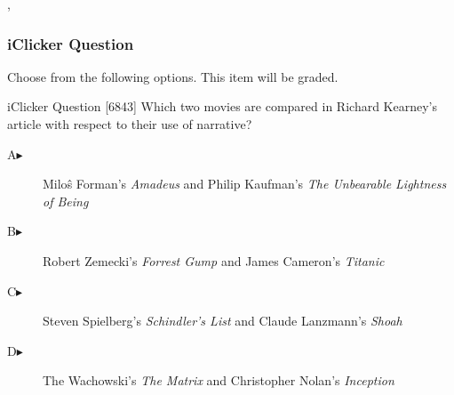 
\begin{frame},
  \frametitle{iClicker Question}
Choose from the following options. This item will be graded.
\begin{block}{iClicker Question}
[6843] Which two movies are compared in Richard Kearney's article with
respect to their use of narrative?
\end{block}
\begin{description}
\item[A\hspace{.2in}$\blacktriangleright$] Milo{\^s} Forman's \emph{Amadeus} and Philip Kaufman's \emph{The Unbearable Lightness of Being}
\item[B\hspace{.2in}$\blacktriangleright$] Robert Zemecki's \emph{Forrest Gump} and James Cameron's \emph{Titanic}
\item[C\hspace{.2in}$\blacktriangleright$] Steven Spielberg's \emph{Schindler's List} and Claude Lanzmann's \emph{Shoah}
\item[D\hspace{.2in}$\blacktriangleright$] The Wachowski's \emph{The Matrix} and Christopher Nolan's \emph{Inception}
\end{description}
\end{frame}
